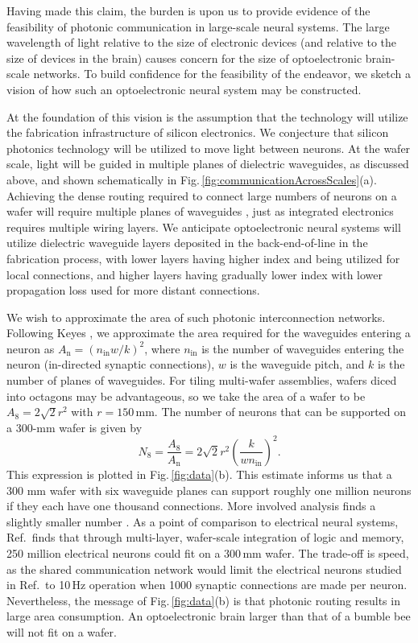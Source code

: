 \documentclass[twocolumn]{article}
\begin{document}
Having made this claim, the burden is upon us to provide evidence of the feasibility of photonic communication in large-scale neural systems. The large wavelength of light relative to the size of electronic devices (and relative to the size of devices in the brain) causes concern for the size of optoelectronic brain-scale networks. To build confidence for the feasibility of the endeavor, we sketch a vision of how such an optoelectronic neural system may be constructed.

At the foundation of this vision is the assumption that the technology will utilize the fabrication infrastructure of silicon electronics. We conjecture that silicon photonics technology will be utilized to move light between neurons. At the wafer scale, light will be guided in multiple planes of dielectric waveguides, as discussed above, and shown schematically in Fig.\,\ref{fig:communicationAcrossScales}(a). Achieving the dense routing required to connect large numbers of neurons on a wafer will require multiple planes of waveguides \cite{chbu2017,chbu2018}, just as integrated electronics requires multiple wiring layers. We anticipate optoelectronic neural systems will utilize dielectric waveguide layers deposited in the back-end-of-line in the fabrication process, with lower layers having higher index and being utilized for local connections, and higher layers having gradually lower index with lower propagation loss used for more distant connections. 

We wish to approximate the area of such photonic interconnection networks. Following Keyes \cite{ke1982}, we approximate the area required for the waveguides entering a neuron as $A_{\mathrm{n}} = (n_{\mathrm{in}} w/k)^2$, where $n_{\mathrm{in}}$ is the number of waveguides entering the neuron (in-directed synaptic connections), $w$ is the waveguide pitch, and $k$ is the number of planes of waveguides. For tiling multi-wafer assemblies, wafers diced into octagons may be advantageous, so we take the area of a wafer to be $A_8 = 2\sqrt{2}r^2$ with $r = 150$\,mm. The number of neurons that can be supported on a 300-mm wafer is given by
\begin{equation}
\label{eq:numNeuronPerWafer}
N_8 = \frac{A_8}{A_{\mathrm{n}}} = 2\sqrt{2}r^2\left(\frac{k}{wn_{\mathrm{in}}}\right)^2.
\end{equation}
This expression is plotted in Fig.\,\ref{fig:data}(b). This estimate informs us that a 300 mm wafer with six waveguide planes can support roughly one million neurons if they each have one thousand connections. More involved analysis finds a slightly smaller number \cite{sh2018e}. As a point of comparison to electrical neural systems, Ref.\,\cite{kuwa2017} finds that through multi-layer, wafer-scale integration of logic and memory, 250 million electrical neurons could fit on a 300\,mm wafer. The trade-off is speed, as the shared communication network would limit the electrical neurons studied in Ref.\,\cite{kuwa2017} to 10\,Hz operation when 1000 synaptic connections are made per neuron. Nevertheless, the message of Fig.\,\ref{fig:data}(b) is that photonic routing results in large area consumption. An optoelectronic brain larger than that of a bumble bee will not fit on a wafer.
\end{document}
